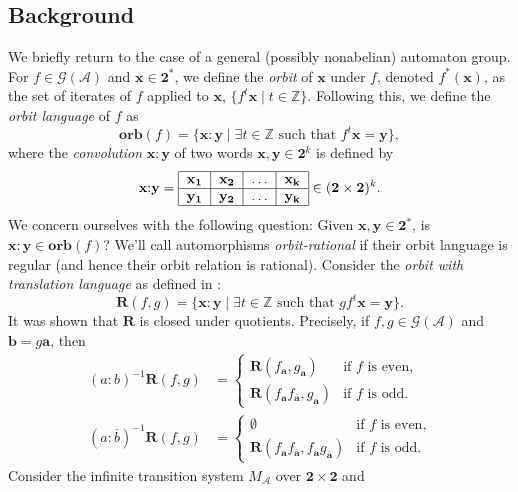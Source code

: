 \documentclass[12pt, letterpaper]{article}
\newcommand{\Z}{\mathbb Z}
\newcommand{\bin}{\mathbf 2}
\newcommand{\A}{\mathcal A}
\newcommand{\ch}[1]{\mathbf{#1}}
\newcommand{\res}[2]{{{#1}_{\ch{#2}}}}
\newcommand{\gp}{\mathcal G}
\newcommand{\R}{\mathbf R}
\newcommand{\f}[1]{\overline{#1}}
\newcommand{\orb}{\mathbf{orb}}
\begin{document}
\subsection{Background}
We briefly return to the case of a general (possibly nonabelian) automaton
group.  For $f \in \gp(\A)$ and $\ch{x} \in \bin^*$, we define the \emph{orbit}
of $\ch{x}$ under $f$, denoted $f^*(\ch{x})$, as the set of iterates of $f$
applied to $\ch{x}$, $\{f^t \ch{x} \mid t \in \Z\}$. Following this, we define
the \emph{orbit language} of $f$ as
\[
    \orb(f) = \{\ch{x} {:} \ch{y} \mid \exists t \in \Z \text{ such that }
    f^t \ch{x} = \ch{y}\},
\]
where the \emph{convolution} $\ch{x} {:} \ch{y}$ of two words $\ch{x}, \ch{y}
\in \bin^k$ is defined by
\[
    \ch{x} {:} \ch{y} = \begin{tabular}{|c|c|c|c|}
        \hline
        $\ch{x_1}$ & $\ch{x_2}$ & $\ldots$ & $\ch{x_k}$\\
        \hline
        $\ch{y_1}$ & $\ch{y_2}$ & $\ldots$ & $\ch{y_k}$\\
        \hline
    \end{tabular} \in (\bin \times \bin)^k.
\]
We concern ourselves with the following question: Given $\ch{x}, \ch{y} \in
\bin^*$, is $\ch{x} {:} \ch{y} \in \orb(f)$? We'll call automorphisms
\emph{orbit-rational} if their orbit language is regular (and hence their orbit
relation is rational).  Consider the \emph{orbit with translation language} as
defined in
\cite{jalc170214}:
\[
    \R(f,g) =
    \{\ch{x} {:} \ch{y} \mid \exists t \in \Z \text{ such that } g f^t
    \ch{x} = \ch{y}\}.
\]
It was shown that $\R$ is closed under quotients. Precisely, if
$f, g \in \gp(\A)$ and $\ch{b} = g \ch{a}$, then
\begin{align*}
    (a {:} b)^{-1} \R(f, g) &=
    \begin{cases}
        \R(\res{f}{a}, \res{g}{a}) & \text{if $f$ is even,}\\
        \R(\res{f}{a}\res{f}{\f{a}}, \res{g}{a}) & \text{if $f$ is odd.}
    \end{cases}\\
    (a {:} \f{b})^{-1} \R(f, g) &=
    \begin{cases}
        \emptyset & \text{if $f$ is even,}\\
        \R(\res{f}{a}\res{f}{\f{a}}, \res{f}{a}\res{g}{\f{a}}) &
        \text{if $f$ is odd.}
    \end{cases}
\end{align*}
Consider the infinite transition system $M_\A$ over $\bin \times \bin$ and
\end{document}
